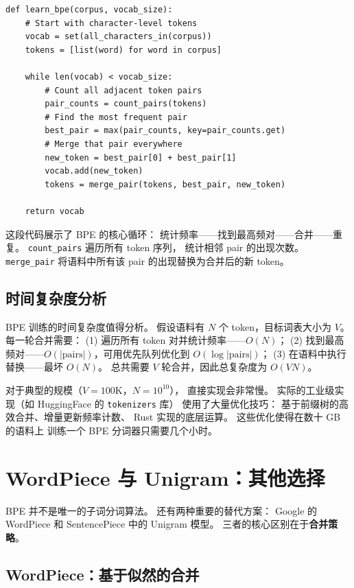 \begin{lstlisting}[caption={BPE core algorithm (simplified)}]
def learn_bpe(corpus, vocab_size):
    # Start with character-level tokens
    vocab = set(all_characters_in(corpus))
    tokens = [list(word) for word in corpus]

    while len(vocab) < vocab_size:
        # Count all adjacent token pairs
        pair_counts = count_pairs(tokens)
        # Find the most frequent pair
        best_pair = max(pair_counts, key=pair_counts.get)
        # Merge that pair everywhere
        new_token = best_pair[0] + best_pair[1]
        vocab.add(new_token)
        tokens = merge_pair(tokens, best_pair, new_token)

    return vocab
\end{lstlisting}

这段代码展示了 BPE 的核心循环：
统计频率——找到最高频对——合并——重复。
\texttt{count\_pairs} 遍历所有 token 序列，
统计相邻 pair 的出现次数。
\texttt{merge\_pair} 将语料中所有该 pair 的出现替换为合并后的新 token。

\subsection{时间复杂度分析}

BPE 训练的时间复杂度值得分析。
假设语料有 $N$ 个 token，目标词表大小为 $V$。
每一轮合并需要：
(1) 遍历所有 token 对并统计频率——$O(N)$；
(2) 找到最高频对——$O(|\text{pairs}|)$，可用优先队列优化到 $O(\log|\text{pairs}|)$；
(3) 在语料中执行替换——最坏 $O(N)$。
总共需要 $V$ 轮合并，因此总复杂度为 $O(VN)$。

对于典型的规模（$V = 100\text{K}$，$N = 10^{10}$），
直接实现会非常慢。
实际的工业级实现（如 HuggingFace 的 \texttt{tokenizers} 库）
使用了大量优化技巧：
基于前缀树的高效合并、增量更新频率计数、
Rust 实现的底层运算。
这些优化使得在数十 GB 的语料上
训练一个 BPE 分词器只需要几个小时。

\section{WordPiece 与 Unigram：其他选择}

BPE 并不是唯一的子词分词算法。
还有两种重要的替代方案：
Google 的 WordPiece 和 SentencePiece 中的 Unigram 模型。
三者的核心区别在于\textbf{合并策略}。

\subsection{WordPiece：基于似然的合并}

